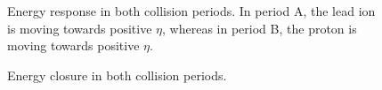 \documentclass[NOTE, atlasdraft=true, texlive=2016, USenglish]{\ATLASLATEXPATH atlasdoc}
\begin{document}
\begin{figure}[htbp]
	\centering
	\caption{Energy response in both collision periods. In period A, the lead ion is moving towards positive $\eta$, whereas in period B, the proton is moving towards positive $\eta$.}
	\label{fig:EnergyResponse}
\end{figure}

\begin{figure}[htbp]
	\centering
	\caption{Energy closure in both collision periods.}
	\label{fig:EnergyClosure}
\end{figure}
\end{document}

